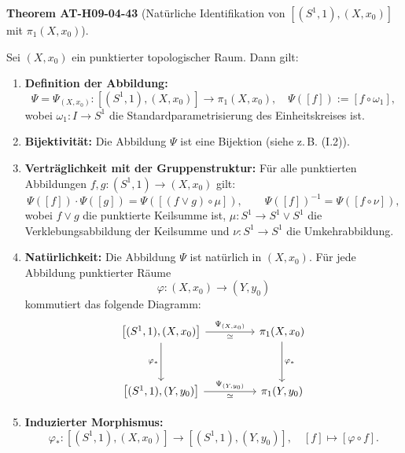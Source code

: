 \documentclass[10pt, letterpaper]{article}
\newcommand{\CustomHeading}[3]{%
  \par\medskip\noindent%
  \textbf{#1 #2} \textnormal{(#3)}.\enskip%
}
\newenvironment{THEO}[2]{\CustomHeading{Theorem}{#1}{#2}}{}
\begin{document}
\begin{THEO}{AT-H09-04-43}{Natürliche Identifikation von $\left[\left(S^1, 1\right),\left(X, x_0\right)\right]$ mit $\pi_1\left(X, x_0\right)$}
Sei $(X, x_0)$ ein punktierter topologischer Raum. Dann gilt:
\begin{enumerate}
  \item \textbf{Definition der Abbildung:}
  \[
  \Psi = \Psi_{(X, x_0)} : \left[(S^1, 1), (X, x_0)\right] \longrightarrow \pi_1(X, x_0), \quad \Psi([f]) := [f \circ \omega_1],
  \]
  wobei $\omega_1 : I \to S^1$ die Standardparametrisierung des Einheitskreises ist.

  \item \textbf{Bijektivität:}  
  Die Abbildung $\Psi$ ist eine Bijektion (siehe z.\,B. (I.2)).

  \item \textbf{Verträglichkeit mit der Gruppenstruktur:}  
  Für alle punktierten Abbildungen $f, g : (S^1,1) \to (X,x_0)$ gilt:
  \[
  \Psi([f]) \cdot \Psi([g]) = \Psi([(f \vee g) \circ \mu]), \qquad
  \Psi([f])^{-1} = \Psi([f \circ \nu]),
  \]
  wobei $f \vee g$ die punktierte Keilsumme ist, $\mu : S^1 \to S^1 \vee S^1$ die Verklebungsabbildung der Keilsumme und $\nu : S^1 \to S^1$ die Umkehrabbildung.

  \item \textbf{Natürlichkeit:}  
  Die Abbildung $\Psi$ ist natürlich in $(X,x_0)$. Für jede Abbildung punktierter Räume
  \[
  \varphi : (X,x_0) \to (Y,y_0)
  \]
  kommutiert das folgende Diagramm:
  \[
  \begin{tikzcd}[row sep=3.5em, column sep=4.5em]
  {\left[(S^1, 1), (X, x_0)\right]} \arrow[r, "\Psi_{(X,x_0)}", "\simeq"'] \arrow[d, "\varphi_*"'] &
  \pi_1(X, x_0) \arrow[d, "\varphi_*"] \\
  {\left[(S^1, 1), (Y, y_0)\right]} \arrow[r, "\Psi_{(Y,y_0)}", "\simeq"'] &
  \pi_1(Y, y_0)
  \end{tikzcd}
  \]

  \item \textbf{Induzierter Morphismus:}  
  \[
  \varphi_* : \left[(S^1, 1), (X, x_0)\right] \longrightarrow \left[(S^1, 1), (Y, y_0)\right], \quad [f] \mapsto [\varphi \circ f].
  \]
\end{enumerate}
\end{THEO}
\end{document}
